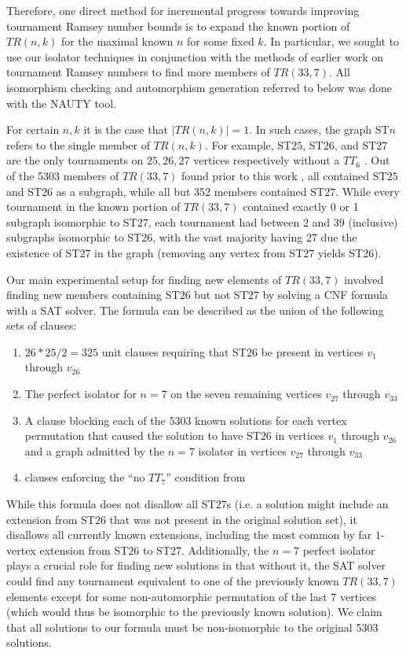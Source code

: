\documentclass[conference]{IEEEtran}
\begin{document}
Therefore, one direct method for incremental progress towards improving tournament Ramsey number bounds is to expand the known portion of $TR(n,k)$ for the maximal known $n$ for some fixed $k$. In particular, we sought to use our isolator techniques in conjunction with the methods of earlier work on tournament Ramsey numbers \cite{directedramsey} to find more members of $TR(33,7)$. All isomorphism checking and automorphism generation referred to below was done with the NAUTY \cite{ref_nauty} tool.

For certain $n,k$ it is the case that $|TR(n,k)| = 1$. In such cases, the graph ST$n$ refers to the single member of $TR(n,k)$. For example, ST$25$, ST$26$, and ST$27$ are the only tournaments on $25,26,27$ vertices respectively without a $TT_6$ \cite{ref_early_tournament_ramsey}. Out of the 5303 members of $TR(33,7)$ found prior to this work \cite{directedramsey}, all contained ST$25$ and ST$26$ as a subgraph, while all but 352 members contained ST$27$. While every tournament in the known portion of $TR(33,7)$ contained exactly 0 or 1 subgraph isomorphic to ST$27$, each tournament had between $2$ and $39$ (inclusive) subgraphs isomorphic to ST$26$, with the vast majority having 27 due the existence of ST$27$ in the graph (removing any vertex from ST$27$ yields ST$26$).

 Our main experimental setup for finding new elements of $TR(33,7)$ involved finding new members containing ST$26$ but not ST$27$ by solving a CNF formula with a SAT solver. The formula can be described as the union of the following sets of clauses:
 
 \begin{enumerate}
 \item $26*25/2 = 325$ unit clauses requiring that ST26 be present in vertices $v_1$ through $v_{26}$
 \item The perfect isolator for $n=7$ on the seven remaining vertices $v_{27}$ through $v_{33}$
 \item A clause blocking each of the 5303 known solutions for each vertex permutation that caused the solution to have ST$26$ in vertices $v_1$ through $v_{26}$ and a graph admitted by the $n=7$ isolator in vertices $v_{27}$ through $v_{33}$
 \item clauses enforcing the ``no $TT_7$'' condition from \cite{directedramsey}
 \end{enumerate}

While this formula does not disallow all ST$27$s (i.e. a solution might include an extension from ST$26$ that was not present in the original solution set), it disallows all currently known extensions, including the most common by far $1$-vertex extension from ST$26$ to ST$27$. Additionally, the $n=7$ perfect isolator plays a crucial role for finding new solutions in that without it, the SAT solver could find any tournament equivalent to one of the previously known $TR(33,7)$ elements except for some non-automorphic permutation of the last 7 vertices (which would thus be isomorphic to the previously known solution). We claim that all solutions to our formula must be non-isomorphic to the original 5303 solutions. 
\end{document}
